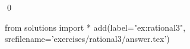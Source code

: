 
\begin{ex} 
  \label{ex:rational3}
  
  \qed
\end{ex} 
\begin{python0}
from solutions import *
add(label="ex:rational3",
    srcfilename='exercises/rational3/answer.tex') 
\end{python0}
